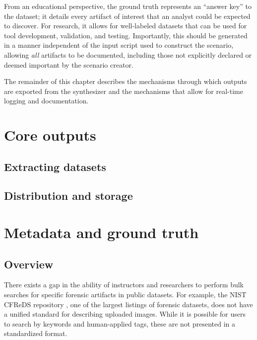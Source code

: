 \documentclass[letterpaper,12pt]{report}
\begin{document}
From an educational perspective, the ground truth represents an ``answer
key'' to the dataset; it details every artifact of interest that an
analyst could be expected to discover. For research, it allows for
well-labeled datasets that can be used for tool development, validation,
and testing. Importantly, this should be generated in a manner
independent of the input script used to construct the scenario, allowing
\emph{all} artifacts to be documented, including those not explicitly
declared or deemed important by the scenario creator.

The remainder of this chapter describes the mechanisms through which
outputs are exported from the synthesizer and the mechanisms that allow
for real-time logging and documentation.

\section{Core outputs}\label{core-outputs}

\subsection{Extracting datasets}\label{extracting-datasets}

\subsection{Distribution and
storage}\label{distribution-and-storage}

\section{Metadata and ground
truth}\label{metadata-and-ground-truth}

\subsection{Overview}\label{overview-1}

There exists a gap in the ability of instructors and researchers to
perform bulk searches for specific forensic artifacts in public
datasets. For example, the NIST CFReDS repository
\cite{nationalinstituteofstandardsandtechnologyCFReDSPortal}, one of
the largest listings of forensic datasets, does not have a unified
standard for describing uploaded images. While it is possible for users
to search by keywords and human-applied tags, these are not presented in
a standardized format.
\end{document}
